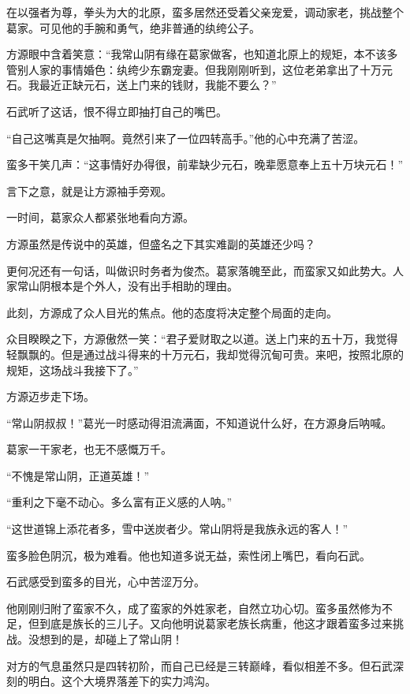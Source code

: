 
\begin{this_body}

在以强者为尊，拳头为大的北原，蛮多居然还受着父亲宠爱，调动家老，挑战整个葛家。可见他的手腕和勇气，绝非普通的纨绔公子。

方源眼中含着笑意：“我常山阴有缘在葛家做客，也知道北原上的规矩，本不该多管别人家的事情婚色：纨绔少东霸宠妻。但我刚刚听到，这位老弟拿出了十万元石。我最近正缺元石，送上门来的钱财，我能不要么？”

石武听了这话，恨不得立即抽打自己的嘴巴。

“自己这嘴真是欠抽啊。竟然引来了一位四转高手。”他的心中充满了苦涩。

蛮多干笑几声：“这事情好办得很，前辈缺少元石，晚辈愿意奉上五十万块元石！”

言下之意，就是让方源袖手旁观。

一时间，葛家众人都紧张地看向方源。

方源虽然是传说中的英雄，但盛名之下其实难副的英雄还少吗？

更何况还有一句话，叫做识时务者为俊杰。葛家落魄至此，而蛮家又如此势大。人家常山阴根本是个外人，没有出手相助的理由。

此刻，方源成了众人目光的焦点。他的态度将决定整个局面的走向。

众目睽睽之下，方源傲然一笑：“君子爱财取之以道。送上门来的五十万，我觉得轻飘飘的。但是通过战斗得来的十万元石，我却觉得沉甸可贵。来吧，按照北原的规矩，这场战斗我接下了。”

方源迈步走下场。

“常山阴叔叔！”葛光一时感动得泪流满面，不知道说什么好，在方源身后呐喊。

葛家一干家老，也无不感慨万千。

“不愧是常山阴，正道英雄！”

“重利之下毫不动心。多么富有正义感的人呐。”

“这世道锦上添花者多，雪中送炭者少。常山阴将是我族永远的客人！”

蛮多脸色阴沉，极为难看。他也知道多说无益，索性闭上嘴巴，看向石武。

石武感受到蛮多的目光，心中苦涩万分。

他刚刚归附了蛮家不久，成了蛮家的外姓家老，自然立功心切。蛮多虽然修为不足，但到底是族长的三儿子。又向他明说葛家老族长病重，他这才跟着蛮多过来挑战。没想到的是，却碰上了常山阴！

对方的气息虽然只是四转初阶，而自己已经是三转巅峰，看似相差不多。但石武深刻的明白。这个大境界落差下的实力鸿沟。


\end{this_body}
